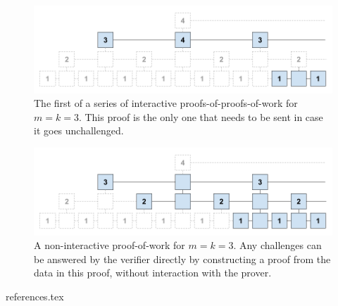 \documentclass[11pt]{llncs}
\begin{document}
\begin{figure}[h]
    \caption{The first of a series of interactive proofs-of-proofs-of-work for
    $m = k = 3$. This proof is the only one that needs to be sent in case it
    goes unchallenged.}
    \centering
    \includegraphics[width=\textwidth,keepaspectratio]{figures/interactive-popow.png}
\end{figure}

\begin{figure}[h]
    \caption{A non-interactive proof-of-work for $m = k = 3$. Any challenges
    can be answered by the verifier directly by constructing a proof from the
    data in this proof, without interaction with the prover.}
    \centering
    \includegraphics[width=\textwidth,keepaspectratio]{figures/non-interactive-popow.png}
\end{figure}

{references.tex}
\end{document}
